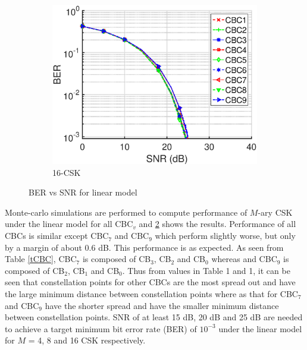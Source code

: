 \documentclass[10pt,letterpaper]{article}
\begin{document}
\begin{figure}[t]
\begin{subfigure}{0.49\textwidth}
		\centering
			\includegraphics[trim={0.1in 0.0in 0.6in 0.3in}, clip=true, width=\textwidth]{M16_16-CSK_BERvsSNR.eps}
			\caption{16-CSK}
			\label{fig16SNR}
		\end{subfigure}
	\caption{BER vs SNR for linear model}
	\label{figBERvsSNR}
\end{figure}

Monte-carlo simulations are performed to compute performance of $M$-ary CSK under the linear model for all CBC$_{v}$ and \figurename{ }\ref{figBERvsSNR} shows the results. Performance of all CBCs is similar except CBC$_{7}$ and CBC$_{9}$ which perform slightly worse, but only by a margin of about 0.6 dB. This performance is as expected. As seen from Table \ref{tCBC}, CBC$_{7}$ is composed of CB$_{3}$, CB$_{2}$ and CB$_{0}$ whereas and CBC$_{9}$ is composed of CB$_{2}$, CB$_{1}$ and CB$_{0}$. Thus from values in Table 1 and \figurename{ }1, it can be seen that constellation points for other CBCs are the most spread out and have the large minimum distance between constellation points where as that for CBC$_{7}$ and CBC$_{9}$ have the shorter spread and have the smaller minimum distance between constellation points. SNR of at least 15 dB, 20 dB and 25 dB are needed to achieve a target minimum bit error rate (BER) of $10^{-3}$ under the linear model for $M$ = 4, 8 and 16 CSK respectively.
\end{document}
